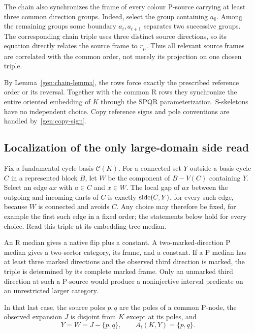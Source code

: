 The chain also synchronizes the frame of every colour P-source carrying
at least three common direction groups.  Indeed, select the group
containing $a_0$.  Among the remaining groups some boundary
$a_i,a_{i+1}$ separates two successive groups.  The corresponding
chain triple uses three distinct source directions, so its equation
directly relates the source frame to $r_\mu$.  Thus all relevant source
frames are correlated with the common order, not merely its projection
on one chosen triple.

By Lemma~\ref{gen:chain-lemma}, the rows force exactly the prescribed
reference order or its reversal.  Together with the common R rows they
synchronize the entire oriented embedding of $K$ through the SPQR
parameterization.  S-skeletons have no independent choice.  Copy
reference signs and pole conventions are handled by~\eqref{gen:copy-sign}.

\subsection{Localization of the only large-domain side read}

Fix a fundamental cycle basis $\mathcal C(K)$.  For a connected set $Y$
outside a basis cycle $C$ in a represented block $B$, let $W$ be the
component of $B-V(C)$ containing $Y$.  Select an edge $ax$ with
$a\in C$ and $x\in W$.  The local gap of $ax$ between the outgoing and
incoming darts of $C$ is exactly $\operatorname{side}(C,Y)$, for every such edge,
because $W$ is connected and avoids $C$.  Any choice may therefore be
fixed, for example the first such edge in a fixed order; the statements
below hold for every choice.  Read this triple at its embedding-tree
median.

An R median gives a native flip plus a constant.  A two-marked-direction
P median gives a two-sector category, its frame, and a constant.  If a
P median has at least three marked directions and the observed third
direction is marked, the triple is determined by its complete marked
frame.  Only an unmarked third direction at such a P-source would produce
a noninjective interval predicate on an unrestricted larger category.

\begin{lemma}
\label{gen:localization}
In that last case, the source poles $p,q$ are the poles of a common
P-node, the observed expansion $J$ is disjoint from $K$ except at its
poles, and
\[
       Y=W=J-\{p,q\},\qquad A_i(K,Y)=\{p,q\}.
\]
\end{lemma}

